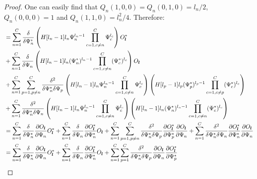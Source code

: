 \begin{proof}
One can easily find that $Q_n(1, 0, 0) = Q_n(0, 1, 0) = l_n / 2$, $Q_n(0, 0, 0) = 1$ and $Q_n(1, 1, 0) =
l_n^2 / 4$.
Therefore:
\begin{equation*}
\begin{split}
	& = \sum_{n=1}^C \frac{\delta}{\delta \Psi_n^*}
		\left( H[l_n - 1] l_n \Psi_n^{l_n - 1} \prod_{c=1, c \ne n}^C \Psi_c^{l_c} \right)
		O_{\boldsymbol{l}}^* \\
	& + \sum_{n=1}^C \frac{\delta}{\delta \Psi_n}
		\left( H[l_n - 1] l_n (\Psi_n^*)^{l_n - 1} \prod_{c=1, c \ne n}^C (\Psi_c^*)^{l_c} \right)
		O_{\boldsymbol{l}} \\
	& + \sum_{n=1}^C \sum_{p=1, p \ne n}^C \frac{\delta^2}{\delta \Psi_n^* \delta \Psi_p}
		\left( H[l_n - 1] l_n \Psi_n^{l_n - 1} \prod_{c=1, c \ne n}^C \Psi_c^{l_c} \right)
		\left( H[l_p - 1] l_p (\Psi_p^*)^{l_p - 1} \prod_{c=1, c \ne p}^C (\Psi_c^*)^{l_c} \right) \\
	& + \sum_{n=1}^C \frac{\delta^2}{\delta \Psi_n^* \delta \Psi_n}
		\left( H[l_n - 1] l_n \Psi_n^{l_n - 1} \prod_{c=1, c \ne n}^C \Psi_c^{l_c} \right)
		\left( H[l_n - 1] l_n (\Psi_n^*)^{l_n - 1} \prod_{c=1, c \ne n}^C (\Psi_c^*)^{l_c} \right) \\
	& = \sum_{n=1}^C \frac{\delta}{\delta \Psi_n^*}
		\frac{\partial O_{\boldsymbol{l}}}{\partial \Psi_n} O_{\boldsymbol{l}}^*
	+ \sum_{n=1}^C \frac{\delta}{\delta \Psi_n}
		\frac{\partial O_{\boldsymbol{l}}^*}{\partial \Psi_n^*} O_{\boldsymbol{l}}
	+ \sum_{n=1}^C \sum_{p=1, p \ne n}^C \frac{\delta^2}{\delta \Psi_n^* \delta \Psi_p}
		\frac{\partial O_{\boldsymbol{l}}^*}{\partial \Psi_p^*}
		\frac{\partial O_{\boldsymbol{l}}}{\partial \Psi_n}
	+ \sum_{n=1}^C \frac{\delta^2}{\delta \Psi_n^* \delta \Psi_n}
		\frac{\partial O_{\boldsymbol{l}}^*}{\partial \Psi_n^*}
		\frac{\partial O_{\boldsymbol{l}}}{\partial \Psi_n} \\
	& = \sum_{n=1}^C \frac{\delta}{\delta \Psi_n^*}
		\frac{\partial O_{\boldsymbol{l}}}{\partial \Psi_n} O_{\boldsymbol{l}}^*
	+ \sum_{n=1}^C \frac{\delta}{\delta \Psi_n}
		\frac{\partial O_{\boldsymbol{l}}^*}{\partial \Psi_n^*} O_{\boldsymbol{l}}
	+ \sum_{n=1}^C \sum_{p=1}^C \frac{\delta^2}{\delta \Psi_n^* \delta \Psi_p}
		\frac{\partial O_{\boldsymbol{l}}}{\partial \Psi_n}
		\frac{\partial O_{\boldsymbol{l}}^*}{\partial \Psi_p^*}
	\qedhere
\end{split}
\end{equation*}
\end{proof}

